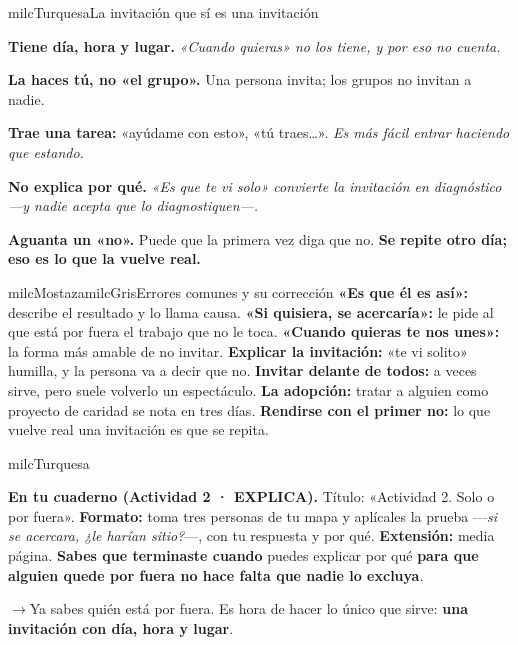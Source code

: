 \documentclass[11pt,letterpaper]{article}
\newcommand{\puente}[1]{%
  \begin{puentebox}%
    \textcolor{milcGradeDark}{$\rightarrow$}\hspace{2mm}#1%
  \end{puentebox}%
}
\begin{document}
\begin{drawbox}{milcTurquesa}{La invitación que sí es una invitación}
\begin{pasoslista}
\item \textbf{Tiene día, hora y lugar.} \emph{«Cuando quieras» no los tiene, y por eso no cuenta.}
\item \textbf{La haces tú, no «el grupo».} Una persona invita; los grupos no invitan a nadie.
\item \textbf{Trae una tarea:} «ayúdame con esto», «tú traes\ldots». \emph{Es más fácil entrar haciendo que estando.}
\item \textbf{No explica por qué.} \emph{«Es que te vi solo» convierte la invitación en diagnóstico ---y nadie acepta que lo diagnostiquen---.}
\item \textbf{Aguanta un «no».} Puede que la primera vez diga que no. \textbf{Se repite otro día; eso es lo que la vuelve real.}
\end{pasoslista}
\end{drawbox}

\begin{softbox}{milcMostaza}{milcGris}{Errores comunes y su corrección}
\textbf{«Es que él es así»:} describe el resultado y lo llama causa. \textbf{«Si quisiera, se acercaría»:} le pide al que está por fuera el trabajo que no le toca. \textbf{«Cuando quieras te nos unes»:} la forma más amable de no invitar. \textbf{Explicar la invitación:} «te vi solito» humilla, y la persona va a decir que no. \textbf{Invitar delante de todos:} a veces sirve, pero suele volverlo un espectáculo. \textbf{La adopción:} tratar a alguien como proyecto de caridad se nota en tres días. \textbf{Rendirse con el primer no:} lo que vuelve real una invitación es que se repita.
\end{softbox}

\begin{infoband}{milcTurquesa}


\textbf{En tu cuaderno (Actividad 2 · EXPLICA).} Título: «Actividad 2. Solo o por fuera». \textbf{Formato:} toma tres personas de tu mapa y aplícales la prueba ---\emph{si se acercara, ¿le harían sitio?}---, con tu respuesta y por qué. \textbf{Extensión:} media página. \textbf{Sabes que terminaste cuando} puedes explicar por qué \textbf{para que alguien quede por fuera no hace falta que nadie lo excluya}.
\end{infoband}

\puente{Ya sabes quién está por fuera. Es hora de hacer lo único que sirve: \textbf{una invitación con día, hora y lugar}.}
\end{document}
